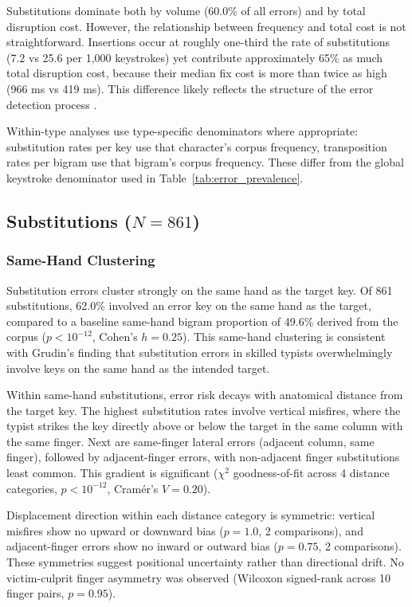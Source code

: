 \documentclass[12pt]{article}
\begin{document}
Substitutions dominate both by volume (60.0\% of all errors) and by total disruption cost. However, the relationship between frequency and total cost is not straightforward. Insertions occur at roughly one-third the rate of substitutions (7.2 vs 25.6 per 1,000 keystrokes) yet contribute approximately 65\% as much total disruption cost, because their median fix cost is more than twice as high (966 ms vs 419 ms). This difference likely reflects the structure of the error detection process \citep{logan2010}.

Within-type analyses use type-specific denominators where appropriate: substitution rates per key use that character's corpus frequency, transposition rates per bigram use that bigram's corpus frequency. These differ from the global keystroke denominator used in Table~\ref{tab:error_prevalence}.

\subsection{Substitutions ($N = 861$)}

\subsubsection{Same-Hand Clustering}

Substitution errors cluster strongly on the same hand as the target key. Of 861 substitutions, 62.0\% involved an error key on the same hand as the target, compared to a baseline same-hand bigram proportion of 49.6\% derived from the corpus ($p < 10^{-12}$, Cohen's $h = 0.25$). This same-hand clustering is consistent with Grudin's \citep{grudin1983} finding that substitution errors in skilled typists overwhelmingly involve keys on the same hand as the intended target.

Within same-hand substitutions, error risk decays with anatomical distance from the target key. The highest substitution rates involve vertical misfires, where the typist strikes the key directly above or below the target in the same column with the same finger. Next are same-finger lateral errors (adjacent column, same finger), followed by adjacent-finger errors, with non-adjacent finger substitutions least common. This gradient is significant ($\chi^2$ goodness-of-fit across 4 distance categories, $p < 10^{-12}$, Cram\'{e}r's $V = 0.20$).

Displacement direction within each distance category is symmetric: vertical misfires show no upward or downward bias ($p = 1.0$, 2 comparisons), and adjacent-finger errors show no inward or outward bias ($p = 0.75$, 2 comparisons). These symmetries suggest positional uncertainty rather than directional drift. No victim-culprit finger asymmetry was observed (Wilcoxon signed-rank across 10 finger pairs, $p = 0.95$).
\end{document}

